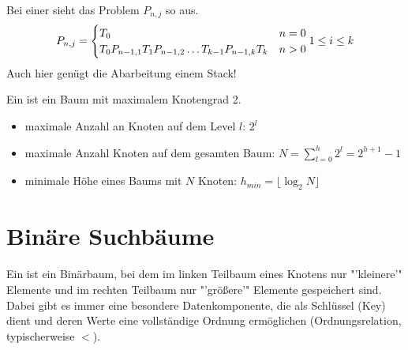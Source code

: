 Bei einer  sieht das Problem $P_{n,j}$  so aus.
\begin{align}
	P_{n,j} = \begin{cases}
		T_0 & n=0 \\ T_0P_{n-1,1}T_1P_{n-1,2}\dots T_{k-1}P_{n-1,k}T_k & n>0
	\end{cases} 1\le i \le k\notag
\end{align}
Auch hier genügt die Abarbeitung einem Stack!

Ein  ist ein Baum mit maximalem Knotengrad 2.
\begin{itemize}
	\item maximale Anzahl an Knoten auf dem Level $l$: $2^l$
	\item maximale Anzahl Knoten auf dem gesamten Baum: $N=\sum\limits_{l=0}^h 2^l = 2^{h+1}-1$
	\item minimale Höhe eines Baums mit $N$ Knoten: $h_{min}=\lfloor\log_2 N\rfloor$
\end{itemize}

\section{Binäre Suchbäume}

Ein  ist ein Binärbaum, bei dem im linken Teilbaum eines Knotens nur "'kleinere'" Elemente und im rechten Teilbaum nur "'größere'" Elemente gespeichert sind. Dabei gibt es immer eine besondere Datenkomponente, die als Schlüssel (Key) dient und deren Werte eine vollständige Ordnung ermöglichen (Ordnungsrelation, typischerweise $<$).

